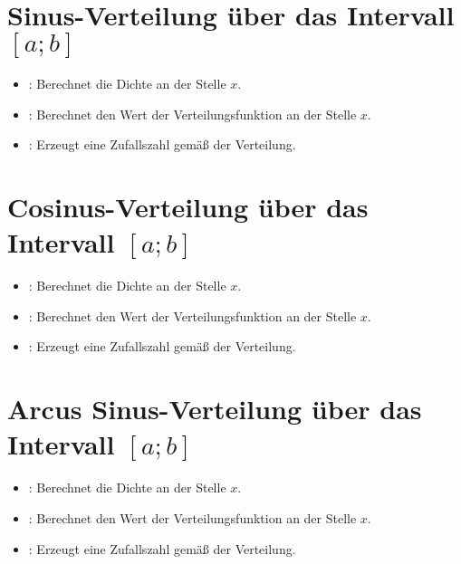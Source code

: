 \section{Sinus-Verteilung über das Intervall \texorpdfstring{$[a;b]$}{[a;b]}}

\begin{itemize}

\item
{}:
Berechnet die Dichte an der Stelle $x$.

\item
{}:
Berechnet den Wert der Verteilungsfunktion an der Stelle $x$.

\item
{}:
Erzeugt eine Zufallszahl gemäß der Verteilung.

\end{itemize}



\section{Cosinus-Verteilung über das Intervall \texorpdfstring{$[a;b]$}{[a;b]}}

\begin{itemize}

\item
{}:
Berechnet die Dichte an der Stelle $x$.

\item
{}:
Berechnet den Wert der Verteilungsfunktion an der Stelle $x$.

\item
{}:
Erzeugt eine Zufallszahl gemäß der Verteilung.

\end{itemize}



\section{Arcus Sinus-Verteilung über das Intervall \texorpdfstring{$[a;b]$}{[a;b]}}

\begin{itemize}

\item
{}:
Berechnet die Dichte an der Stelle $x$.

\item
{}:
Berechnet den Wert der Verteilungsfunktion an der Stelle $x$.

\item
{}:
Erzeugt eine Zufallszahl gemäß der Verteilung.

\end{itemize}




